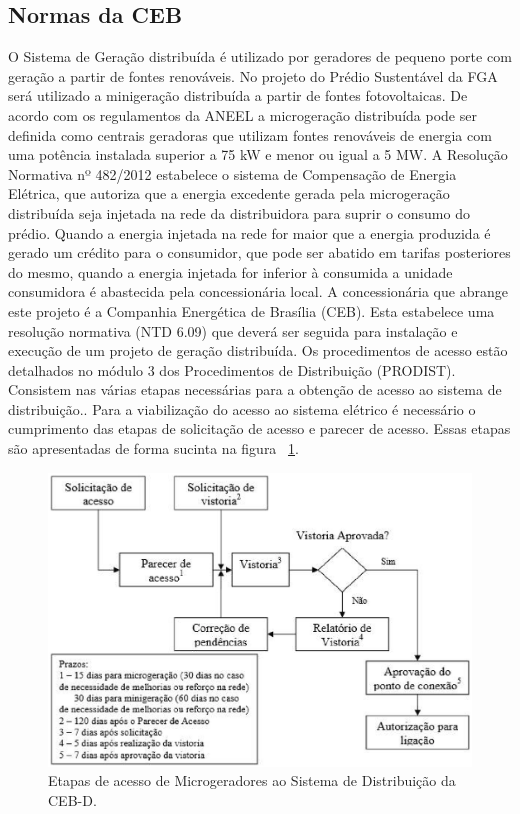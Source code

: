 \subsection{Normas da CEB}

O Sistema de Geração distribuída é utilizado por geradores de pequeno porte com geração a partir de fontes renováveis. No projeto do Prédio Sustentável da FGA será utilizado a minigeração distribuída a partir de fontes fotovoltaicas.
De acordo com os regulamentos da ANEEL a microgeração distribuída pode ser definida como centrais geradoras que utilizam fontes renováveis de energia com uma potência instalada superior a 75 kW e menor ou igual a 5 MW. A Resolução Normativa nº 482/2012 estabelece o sistema de Compensação de Energia Elétrica, que autoriza que a energia excedente gerada pela microgeração distribuída seja injetada na rede da distribuidora para suprir o consumo do prédio. Quando a energia injetada na rede for maior que a energia produzida é gerado um crédito para o consumidor, que pode ser abatido em tarifas posteriores do mesmo, quando a energia injetada for inferior à consumida a unidade consumidora é abastecida pela concessionária local.
A concessionária que abrange este projeto é a Companhia Energética de Brasília (CEB). Esta estabelece uma resolução normativa (NTD 6.09) que deverá ser seguida para instalação e execução de um projeto de geração distribuída.
Os procedimentos de acesso estão detalhados no módulo 3 dos Procedimentos de Distribuição (PRODIST). Consistem nas várias etapas necessárias para a obtenção de acesso ao sistema de distribuição.. Para a viabilização do acesso ao sistema elétrico é necessário o cumprimento das etapas de solicitação de acesso e parecer de acesso. Essas etapas são apresentadas de forma sucinta na figura ~\ref{fig:fluxograma}.

\begin{figure}[!h]
  \centering
  \includegraphics[keepaspectratio=true,scale=0.5]{figuras/fluxograma_smartgrid.eps}
  \caption{Etapas de acesso de Microgeradores ao Sistema de Distribuição da CEB-D.}
  \label{fig:fluxograma}
\end{figure}


